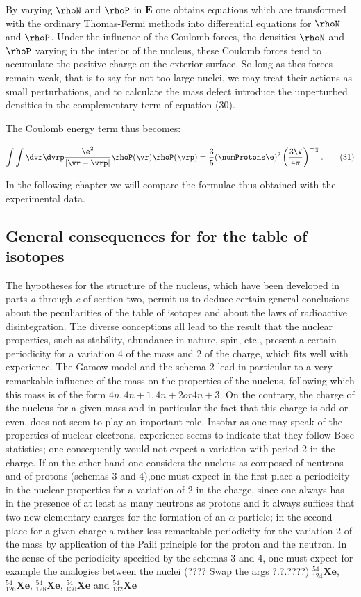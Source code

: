 \documentclass{article}
\newcommand{\var}[1]{\pmb{#1}}
\newcommand{\element}[1]{\textbf{#1}}
\newcommand{\isotope}[3]{
{{}^{#3}_{#2}\element{#1}}
}
\newcommand{\E}{\var{E}}
\newcommand{\nequ}[2]{
\begin{equation*}
#1
\tag{#2}
\end{equation*}
}
\begin{document}
By varying $\rhoN$ and $\rhoP$ in $\E$ one obtains equations which are transformed with the ordinary Thomas-Fermi methods into differential equations for $\rhoN$ and $\rhoP$. Under the influence of the Coulomb forces, the densities $\rhoN$ and $\rhoP$ varying in the interior of the nucleus, these Coulomb forces tend to accumulate the positive charge on the exterior surface. So long as thes forces remain weak, that is to say for not-too-large nuclei, we may treat their actions as small perturbations, and to calculate the mass defect introduce the unperturbed densities in the complementary term of equation (30).

The Coulomb energy term thus becomes:

\nequ{
\int\int \dvr\dvrp\frac{\e^2}{|\vr - \vrp|}\rhoP(\vr)\rhoP(\vrp) = \frac{3}{5}(\numProtons\e)^2
\left( \frac{3\V}{4\pi} \right)^{-\frac{1}{3}}.
}{31}

In the following chapter we will compare the formulae thus obtained with the experimental data.

\subsection{General consequences for for the table of isotopes}

The hypotheses for the structure of the nucleus, which have been developed in parts \textit{a} through \textit{c} of section two, permit us to deduce certain general conclusions about the peculiarities of the table of isotopes and about the laws of radioactive disintegration.
The diverse conceptions all lead to the result that the nuclear properties, such as stability, abundance in nature, spin, etc., present a certain periodicity for a variation 4 of the mass and 2 of the charge, which fits well with experience. The Gamow model and the schema 2 lead in particular to a very remarkable influence of the mass on the properties of the nucleus, following which this mass is of the form $4n, 4n + 1, 4n + 2 or 4n + 3$. On the contrary, the charge of the nucleus for a given mass and in particular the fact that this charge is odd or even, does not seem to play an important role. Insofar as one may speak of the properties of nuclear electrons, experience seems to indicate that they follow Bose statistics; one consequently would not expect a variation with period 2 in the charge. If on the other hand one considers the nucleus as composed of neutrons and of protons (schemas 3 and 4),one must expect in the first place a periodicity in the nuclear properties for a variation of 2 in the charge, since one always has in the presence of at least as many neutrons as protons and it always suffices that two new elementary charges for the formation of an $\alpha$ particle; in the second place for a given charge a rather less remarkable periodicity for the variation 2 of the mass by application of the Paili principle for the proton and the neutron. In the sense of the periodicity specified by the schemas 3 and 4, one must expect for example the analogies between the nuclei (???? Swap the args ?.?.????) $\isotope{Xe}{124}{54}$, $\isotope{Xe}{126}{54}$, $\isotope{Xe}{128}{54}$, $\isotope{Xe}{130}{54}$ and $\isotope{Xe}{132}{54}$ 
\end{document}
